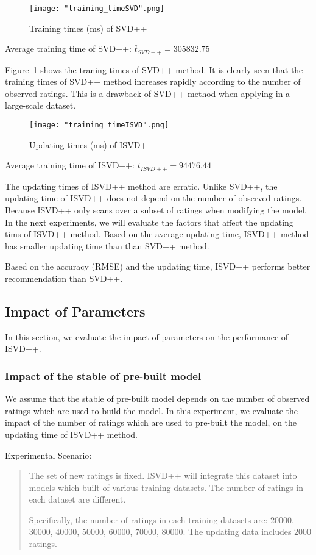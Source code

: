 \documentclass[oneside,13pt]{extreport}
\begin{document}
\clearpage

\begin{figure}[h!]
    \centering
    \texttt{[image: "training\_timeSVD".png]} 
    \caption{Training times (ms) of SVD++}
    \label{fig:train_timeSVD++}
\end{figure}

Average training time of SVD++: $\bar t_{SVD++} = 305832.75$

Figure~\ref{fig:train_timeSVD++} shows the traning times of SVD++ method. It is clearly seen that the training times of SVD++ method increases rapidly according to the number of observed ratings. This is a drawback of SVD++ method when applying in a large-scale dataset. 
\clearpage
\begin{figure}[h!]
    \centering
    \texttt{[image: "training\_timeISVD".png]} 
    \caption{Updating times (ms) of ISVD++}
    \label{fig:train_timeISVD++}
\end{figure}
Average training time of ISVD++: $\bar t_{ISVD++} =94476.44$

The updating times of ISVD++ method are erratic. Unlike SVD++, the updating time of ISVD++ does not depend on the number of observed ratings. Because ISVD++ only scans over a subset of ratings when modifying the model.
In the next experiments, we will evaluate the factors that affect the updating tims of ISVD++ method. Based on the average updating time, ISVD++ method has smaller updating time than than SVD++ method.

Based on the accuracy (RMSE) and the updating time, ISVD++ performs better recommendation than SVD++.
\subsection{Impact of Parameters}
\label{Impact of Parameters}
In this section, we evaluate the impact of parameters on the performance of ISVD++.
\subsubsection{Impact of the stable of pre-built model}
We assume that the stable of pre-built model depends on the number of observed ratings which are used to build the model. In this experiment, we evaluate the impact of the number of ratings which are used to pre-built the model, on the updating time of ISVD++ method.

Experimental Scenario: 
\begin{quote}
The set of new ratings is fixed. ISVD++ will integrate this dataset into models which built of various training datasets. The number of ratings in each dataset are different. 

Specifically, the number of ratings in each training datasets are: $20000$, $30000$, $40000$, $50000$, $60000$, $70000$, $80000$. The updating data includes $2000$ ratings.
\end{quote}
\end{document}
